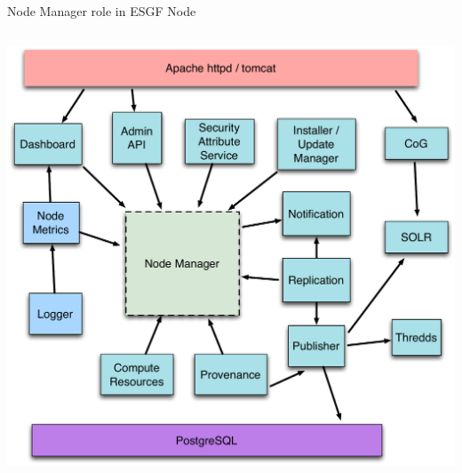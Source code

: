 \documentclass{beamer}
\begin{document}
\begin{frame}{Node Manager role in ESGF Node}
\begin{columns}
\begin{column}{.5\linewidth}
\includegraphics[width=\textwidth]{ESGF-node-components.pdf}
\end{column}
\end{columns}

\end{frame}
\end{document}
